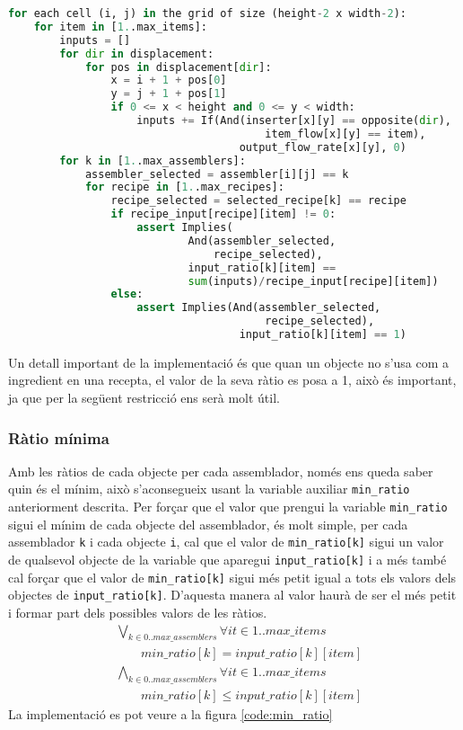 \begin{lstlisting}[language=Python, caption=Input Ratio, label=code:input_ratio]
for each cell (i, j) in the grid of size (height-2 x width-2):
    for item in [1..max_items]:
        inputs = []
        for dir in displacement:
            for pos in displacement[dir]:
                x = i + 1 + pos[0]
                y = j + 1 + pos[1]
                if 0 <= x < height and 0 <= y < width:
                    inputs += If(And(inserter[x][y] == opposite(dir),
                                        item_flow[x][y] == item),
                                    output_flow_rate[x][y], 0)
        for k in [1..max_assemblers]:
            assembler_selected = assembler[i][j] == k
            for recipe in [1..max_recipes]:
                recipe_selected = selected_recipe[k] == recipe
                if recipe_input[recipe][item] != 0:
                    assert Implies(
                            And(assembler_selected,
                                recipe_selected),
                            input_ratio[k][item] == 
                            sum(inputs)/recipe_input[recipe][item])
                else:
                    assert Implies(And(assembler_selected,
                                        recipe_selected),
                                    input_ratio[k][item] == 1)
\end{lstlisting}

Un detall important de la implementació és que quan un objecte no s'usa com a ingredient en una recepta, el valor de la seva ràtio es posa a 1, això és important, ja que per la següent restricció ens serà molt útil.

\subsubsection{Ràtio mínima}
Amb les ràtios de cada objecte per cada assemblador, només ens queda saber quin és el mínim, això s'aconsegueix usant la variable auxiliar \lstinline{min_ratio} anteriorment descrita. Per forçar que el valor que prengui la variable \lstinline{min_ratio} sigui el mínim de cada objecte del assemblador, és molt simple, per cada assemblador \lstinline{k} i cada objecte \lstinline{i}, cal que el valor de \lstinline{min_ratio[k]} sigui un valor de qualsevol objecte de la variable que aparegui \lstinline{input_ratio[k]} i a més també cal forçar que el valor de \lstinline{min_ratio[k]} sigui més petit igual a tots els valors dels objectes de \lstinline{input_ratio[k]}. D'aquesta manera al valor haurà de ser el més petit i formar part dels possibles valors de les ràtios.
\begin{align*}
    &\bigvee_{k\in 0..max\_assemblers} \forall it \in 1..max\_items\\
    &\qquad min\_ratio[k]=input\_ratio[k][item]
\end{align*}
\begin{align*}
    &\bigwedge_{k\in 0..max\_assemblers} \forall it \in 1..max\_items\\
    &\qquad min\_ratio[k]\leq input\_ratio[k][item]
\end{align*}
La implementació es pot veure a la figura \ref{code:min_ratio}

